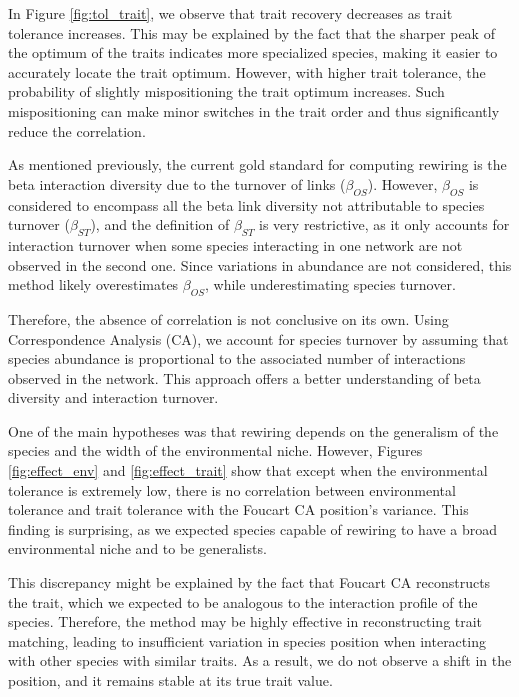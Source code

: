 In Figure \ref{fig:tol_trait}, we observe that trait recovery decreases as trait tolerance increases.
This may be explained by the fact that the sharper peak of the optimum of the traits indicates more specialized species, making it easier to accurately locate the trait optimum. However, with higher trait tolerance, the probability of slightly mispositioning the trait optimum increases. Such mispositioning can make minor switches in the trait order and thus significantly reduce the correlation.




As mentioned previously, the current gold standard for computing rewiring is the beta interaction diversity due to the turnover of links ($\beta_{OS}$). However, $\beta_{OS}$ is considered to encompass all the beta link diversity not attributable to species turnover ($\beta_{ST}$), and the definition of $\beta_{ST}$ is very restrictive, as it only accounts for interaction turnover when some species interacting in one network are not observed in the second one. Since variations in abundance are not considered, this method likely overestimates $\beta_{OS}$, while underestimating species turnover.


Therefore, the absence of correlation is not conclusive on its own. Using Correspondence Analysis (CA), we account for species turnover by assuming that species abundance is proportional to the associated number of interactions observed in the network. This approach offers a better understanding of beta diversity and interaction turnover.



One of the main hypotheses was that rewiring depends on the generalism of the species and the width of the environmental niche. However, Figures \ref{fig:effect_env} and \ref{fig:effect_trait} show that except when the environmental tolerance is extremely low, there is no correlation between environmental tolerance and trait tolerance with the Foucart CA position's variance. This finding is surprising, as we expected species capable of rewiring to have a broad environmental niche and to be generalists.

This discrepancy might be explained by the fact that Foucart CA reconstructs the trait, which we expected to be analogous to the interaction profile of the species. Therefore, the method may be highly effective in reconstructing trait matching, leading to insufficient variation in species position when interacting with other species with similar traits. As a result,  we do not observe a shift in the position, and it remains stable at its true trait value.

